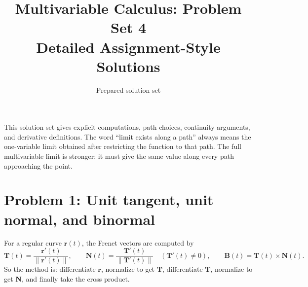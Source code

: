 \documentclass[11pt]{article}
\title{\textbf{Multivariable Calculus: Problem Set 4}\\Detailed Assignment-Style Solutions}
\author{Prepared solution set}
\date{}
\newcommand{\norm}[1]{\left\lVert #1 \right\rVert}
\begin{document}
\maketitle

\begin{center}
\begin{tcolorbox}[enhanced,width=0.92\textwidth,colback=softgray,colframe=navy!60!black,arc=2mm,boxrule=0.7pt]
This solution set gives explicit computations, path choices, continuity arguments, and derivative definitions.  The word ``limit exists along a path'' always means the one-variable limit obtained after restricting the function to that path.  The full multivariable limit is stronger: it must give the same value along every path approaching the point.
\end{tcolorbox}
\end{center}

\tableofcontents
\newpage

\section{Problem 1: Unit tangent, unit normal, and binormal}

\begin{strategybox}
For a regular curve \(\mathbf r(t)\), the Frenet vectors are computed by
\[
\mathbf T(t)=\frac{\mathbf r'(t)}{\norm{\mathbf r'(t)}},\qquad
\mathbf N(t)=\frac{\mathbf T'(t)}{\norm{\mathbf T'(t)}}\quad(\mathbf T'(t)\neq 0),\qquad
\mathbf B(t)=\mathbf T(t)\times \mathbf N(t).
\]
So the method is: differentiate \(\mathbf r\), normalize to get \(\mathbf T\), differentiate \(\mathbf T\), normalize to get \(\mathbf N\), and finally take the cross product.
\end{strategybox}

\begin{center}
\end{center}
\end{document}
